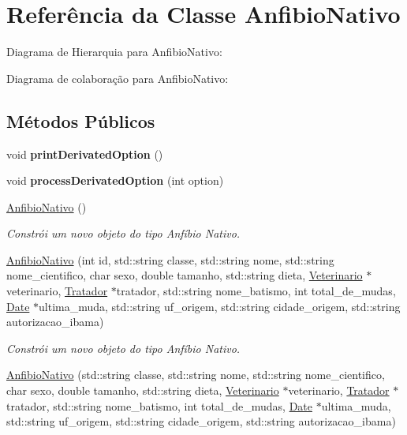 \hypertarget{classAnfibioNativo}{}\section{Referência da Classe Anfibio\+Nativo}
\label{classAnfibioNativo}


Diagrama de Hierarquia para Anfibio\+Nativo\+:


Diagrama de colaboração para Anfibio\+Nativo\+:
\subsection*{Métodos Públicos}
\begin{DoxyCompactItemize}
\item 
\mbox{\label{classAnfibioNativo_a00d57bca19dec1bf15033a5680d9124e}} 
void {\bfseries print\+Derivated\+Option} ()
\item 
\mbox{\label{classAnfibioNativo_afe3a067f7ea8291942d3b5b1680d5d15}} 
void {\bfseries process\+Derivated\+Option} (int option)
\item 
\mbox{\label{classAnfibioNativo_a469824d5a99c24f0e5867c3b7e33cc6d}} 
\hyperlink{classAnfibioNativo_a469824d5a99c24f0e5867c3b7e33cc6d}{Anfibio\+Nativo} ()
\begin{DoxyCompactList}\small\item\em Constrói um novo objeto do tipo Anfíbio Nativo. \end{DoxyCompactList}\item 
\hyperlink{classAnfibioNativo_aea42e00a0890c29e8ba0ded0f280f3be}{Anfibio\+Nativo} (int id, std\+::string classe, std\+::string nome, std\+::string nome\+\_\+cientifico, char sexo, double tamanho, std\+::string dieta, \hyperlink{classVeterinario}{Veterinario} $\ast$veterinario, \hyperlink{classTratador}{Tratador} $\ast$tratador, std\+::string nome\+\_\+batismo, int total\+\_\+de\+\_\+mudas, \hyperlink{classDate}{Date} $\ast$ultima\+\_\+muda, std\+::string uf\+\_\+origem, std\+::string cidade\+\_\+origem, std\+::string autorizacao\+\_\+ibama)
\begin{DoxyCompactList}\small\item\em Constrói um novo objeto do tipo Anfíbio Nativo. \end{DoxyCompactList}\item 
\hyperlink{classAnfibioNativo_a892a98c092deab46c55d1fdcade4caf4}{Anfibio\+Nativo} (std\+::string classe, std\+::string nome, std\+::string nome\+\_\+cientifico, char sexo, double tamanho, std\+::string dieta, \hyperlink{classVeterinario}{Veterinario} $\ast$veterinario, \hyperlink{classTratador}{Tratador} $\ast$tratador, std\+::string nome\+\_\+batismo, int total\+\_\+de\+\_\+mudas, \hyperlink{classDate}{Date} $\ast$ultima\+\_\+muda, std\+::string uf\+\_\+origem, std\+::string cidade\+\_\+origem, std\+::string autorizacao\+\_\+ibama)

\end{DoxyCompactItemize}
